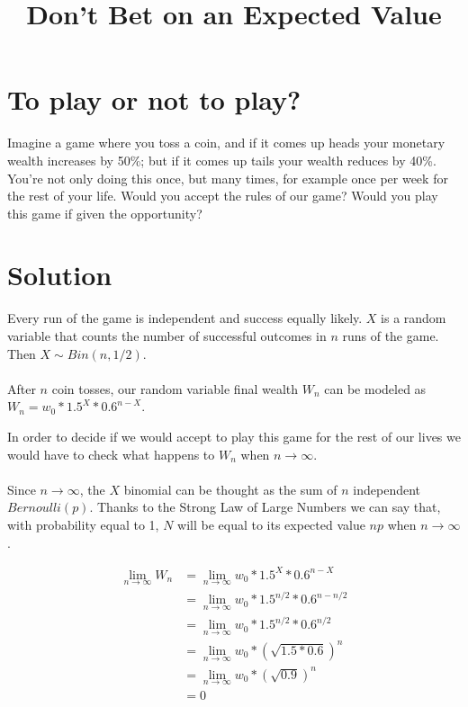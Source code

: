 \documentclass[12pt]{article}
\title{Don't Bet on an Expected Value}
\begin{document}
\maketitle
{}

\section{To play or not to play?}

Imagine a game where you toss a coin, and if it comes up heads your monetary wealth increases by 50\%; but if it comes up tails your wealth reduces by 40\%. You’re not only doing this once, but many times, for example once per week for the rest of your life. Would you accept the rules of our game? Would you play this game if given the opportunity?

\section{Solution}
Every run of the game is independent and success equally likely. $X$ is a random variable that counts the number of successful outcomes in $n$ runs of the game. Then $X \sim Bin(n, 1/2)$.
\\\\
After $n$ coin tosses, our random variable final wealth $W_n$ can be modeled as $W_n = w_0 * 1.5^X * 0.6^{n-X}$.

In order to decide if we would accept to play this game for the rest of our lives we would have to check what happens to $W_n$ when $n \rightarrow \infty$.
\\\\
Since $n \rightarrow \infty$, the $X$ binomial can be thought as the sum of $n$ independent $Bernoulli(p)$. Thanks to the Strong Law of Large Numbers we can say that, with probability equal to 1, $N$ will be equal to its expected value $np$ when $n \rightarrow \infty$.

\begin{align}
    \lim_{n\to\infty} W_n & = \lim_{n\to\infty} w_0 * 1.5^X * 0.6^{n-X}\\
    & = \lim_{n\to\infty} w_0 * 1.5^{n/2} * 0.6^{n - n/2}\\
    & = \lim_{n\to\infty}w_0 * 1.5^{n/2} * 0.6^{n/2}\\
    & = \lim_{n\to\infty}w_0 * (\sqrt{1.5*0.6})^{n}\\
    & = \lim_{n\to\infty}w_0 * (\sqrt{0.9}) ^{n}\\
    & = 0
\end{align}
\end{document}
